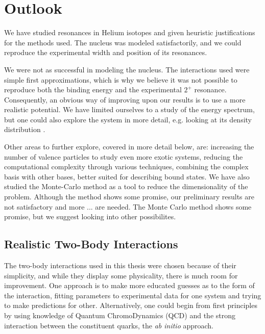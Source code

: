 \documentclass[../main/report.tex]{subfiles}
\begin{document}
\chapter{Outlook}
\label{cha:outlook}


We have studied resonances in Helium isotopes and given heuristic justifications for the methods used. The  nucleus was modeled satisfactorily, and we could reproduce the experimental width and position of its resonances.

We were not as successful in modeling the  nucleus. The interactions used were simple first approximations, which is why we believe it was not possible to reproduce both the binding energy and the experimental $2^+$ resonance. Consequently, an obvious way of improving upon our results is to use a more realistic potential. We have limited ourselves to a study of the energy spectrum, but one could also explore the  system in more detail, e.g. looking at its density distribution \cite{radii}.

Other areas to further explore, covered in more detail below, are: increasing the number of valence particles to study even more exotic systems, reducing the computational complexity through various techniques, combining the complex basis with other bases, better suited for describing bound states.
We have also studied the Monte-Carlo method as a tool to reduce the dimensionality of the problem. Although the method shows some promise, our preliminary results are not satisfactory and more ... are needed.
The Monte Carlo method shows some promise, but we suggest looking into other possibilites.

\section{Realistic Two-Body Interactions}
The two-body interactions used in this thesis were chosen because of their simplicity, and while they display some physicality, there is much room for improvement. 
One approach is to make more educated guesses as to the form of the interaction, fitting parameters to experimental data for one system and trying to make predictions for other.
Alternatively, one could begin from first principles by using knowledge of Quantum ChromoDynamics (QCD) and the strong interaction between the constituent quarks, the \emph{ab initio} approach.
\end{document}
